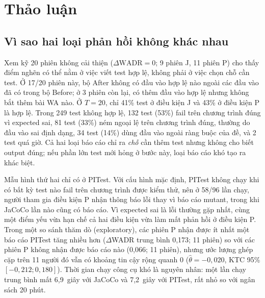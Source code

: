 \section{Thảo luận}
\label{sec:discussion}

\subsection{Vì sao hai loại phản hồi không khác nhau}
Xem kỹ 20 phiên không cải thiện ($\Delta\mathrm{WADR} = 0$; 9 phiên J, 11 phiên P) cho thấy điểm nghẽn có thể nằm ở việc viết test hợp lệ, không phải ở việc chọn chỗ cần test.
Ở 17/20 phiên này, bộ After không có đầu vào hợp lệ nào ngoài các đầu vào đã có trong bộ Before; ở 3 phiên còn lại, có thêm đầu vào hợp lệ nhưng không bắt thêm bài WA nào.
Ở $T = 20$, chỉ 41\% test ở điều kiện J và 43\% ở điều kiện P là hợp lệ.
Trong 249 test không hợp lệ, 132 test (53\%) fail trên chương trình đúng vì expected sai, 81 test (33\%) ném ngoại lệ trên chương trình đúng, thường do đầu vào sai định dạng, 34 test (14\%) dùng đầu vào ngoài ràng buộc của đề, và 2 test quá giờ.
Cả hai loại báo cáo chỉ ra \emph{chỗ} cần thêm test nhưng không cho biết output đúng; nếu phần lớn test mới hỏng ở bước này, loại báo cáo khó tạo ra khác biệt.

Mẫu hình thứ hai chỉ có ở PITest.
Với cấu hình mặc định, PITest không chạy khi có bất kỳ test nào fail trên chương trình được kiểm thử, nên ở 58/96 lần chạy, người tham gia điều kiện P nhận thông báo lỗi thay vì báo cáo mutant, trong khi JaCoCo lần nào cũng có báo cáo.
Vì expected sai là lỗi thường gặp nhất, cùng một điểm yếu vừa hạn chế cả hai điều kiện vừa làm mất phản hồi ở điều kiện P.
Trong một so sánh thăm dò (exploratory), các phiên P nhận được ít nhất một báo cáo PITest tăng nhiều hơn ($\Delta$WADR trung bình 0,173; 11 phiên) so với các phiên P không nhận được báo cáo nào (0,066; 11 phiên), nhưng ước lượng ghép cặp trên 11 người đó vẫn có khoảng tin cậy rộng quanh 0 ($\hat{\theta} = -0,020$, KTC 95\% $[-0,212; 0,180]$).
Thời gian chạy công cụ khó là nguyên nhân: một lần chạy trung bình mất 6,9~giây với JaCoCo và 7,2~giây với PITest, rất nhỏ so với ngân sách 20 phút.

